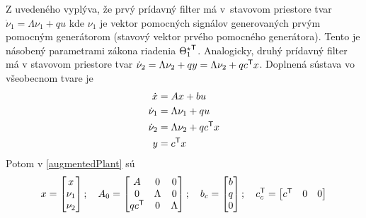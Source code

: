 \documentclass[a4paper, 10pt, ]{article}
\begin{document}
Z uvedeného vyplýva, že prvý prídavný filter má v~stavovom priestore tvar $\dot \nu_1 = \Lambda \nu_1 + q u $ kde $\nu_1$ je vektor pomocných signálov generovaných prvým pomocným generátorom (stavový vektor prvého pomocného generátora). Tento je násobený parametrami zákona riadenia ${\Theta_1^\star}^{\mathsf{T}}$. Analogicky, druhý prídavný filter má v stavovom priestore tvar $\dot \nu_2 = \Lambda \nu_2 + q y = \Lambda \nu_2 + q c^{\mathsf{T}} x$.
Doplnená sústava vo všeobecnom tvare je
\begin{subequations} \label{vsDoplnenaSustavaMRCp}
	\begin{align}
		\dot x &= A x + b u \\
		\dot \nu_1 &= \Lambda \nu_1 + q u \\
		\dot \nu_2 &= \Lambda \nu_2 + q c^{\mathsf{T}} x \\
		 y &= c^{\mathsf{T}} x
	\end{align}
\end{subequations}
Potom v \eqref{augmentedPlant} sú
\begin{align} \label{vsMaticeDoplnenejSustMRCp}
 	x = \begin{bmatrix} x \\ \nu_1 \\ \nu_2 \end{bmatrix}   ; \quad
	A_0 = \begin{bmatrix} A & 0 & 0 \\ 0 & \Lambda & 0 \\ q c^{\mathsf{T}} & 0 & \Lambda \end{bmatrix}   ; \quad
	b_c = \begin{bmatrix} b \\ q\\ 0 \end{bmatrix}   ; \quad
    c_c^{\mathsf{T}} = \begin{bmatrix} c^{\mathsf{T}} & 0 & 0 \end{bmatrix}
\end{align}
\end{document}
